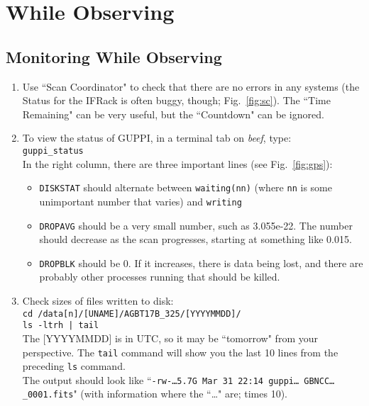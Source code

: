 \documentclass[11pt]{article}
\begin{document}

\section{While Observing}  %

\subsection{Monitoring While Observing}  %
\label{ssec:mon}
\begin{enumerate}
 \item Use ``Scan Coordinator" to check that there are no errors in any systems (the Status for the IFRack is often buggy, though; Fig.~\ref{fig:sc}). The ``Time Remaining" can be very useful, but the ``Countdown" can be ignored. 
 \item To view the status of GUPPI, in a terminal tab on \textit{beef}, type: \\
 \texttt{guppi\_status} \\
 In the right column, there are three important lines (see Fig.~\ref{fig:gps}): \begin{itemize}
  \item \texttt{DISKSTAT} should alternate between \texttt{waiting(nn)} (where \texttt{nn} is some unimportant number that varies) and \texttt{writing}
  \item \texttt{DROPAVG} should be a very small number, such as 3.055e-22.  The number should decrease as the scan progresses, starting at something like 0.015.  
  \item \texttt{DROPBLK} should be 0.  If it increases, there is data being lost, and there are probably other processes running that should be killed.\end{itemize}
 \item\label{st:ltrh} Check sizes of files written to disk: \\
 \texttt{cd /data[n]/[UNAME]/AGBT17B\_325/[YYYYMMDD]/ \\
 ls -ltrh | tail} \\
 The [YYYYMMDD] is in UTC, so it may be ``tomorrow" from your perspective.  The \texttt{tail} command will show you the last 10 lines from the preceding \texttt{ls} command.  \\
 The output should look like 
 ``\texttt{-rw-\dots 5.7G Mar 31 22:14 guppi\dots\,GBNCC\dots\_0001.fits}" (with information where the ``\dots" are; times 10). \\

\end{enumerate}
\end{document}
